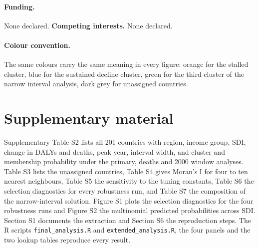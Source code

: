\documentclass[11pt,a4paper]{article}
\begin{document}
\paragraph{Funding.} None declared. \textbf{Competing interests.} None declared.

\paragraph{Colour convention.} The same colours carry the same meaning in every figure: orange for the stalled cluster, blue for the sustained decline cluster, green for the third cluster of the narrow interval analysis, dark grey for unassigned countries.

\section*{Supplementary material}
Supplementary Table S2 lists all 201 countries with region, income group, SDI, change in DALYs and deaths, peak year, interval width, and cluster and membership probability under the primary, deaths and 2000 window analyses. Table S3 lists the unassigned countries, Table S4 gives Moran's I for four to ten nearest neighbours, Table S5 the sensitivity to the tuning constants, Table S6 the selection diagnostics for every robustness run, and Table S7 the composition of the narrow-interval solution. Figure S1 plots the selection diagnostics for the four robustness runs and Figure S2 the multinomial predicted probabilities across SDI. Section S1 documents the extraction and Section S6 the reproduction steps. The R scripts \texttt{final\_analysis.R} and \texttt{extended\_analysis.R}, the four panels and the two lookup tables reproduce every result.



\end{document}
